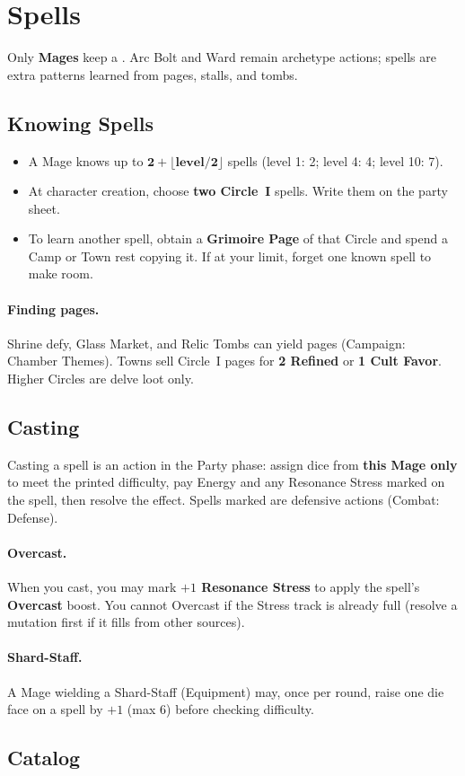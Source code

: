\section{Spells}

Only \textbf{Mages} keep a . Arc Bolt and Ward remain archetype actions; spells are extra patterns learned from pages, stalls, and tombs.

\subsection{Knowing Spells}

\begin{itemize}
    \item A Mage knows up to $\mathbf{2 + \lfloor \textrm{level}/2 \rfloor}$ spells (level 1: 2; level 4: 4; level 10: 7).
    \item At character creation, choose \textbf{two Circle~I} spells. Write them on the party sheet.
    \item To learn another spell, obtain a \textbf{Grimoire Page} of that Circle and spend a Camp or Town rest copying it. If at your limit, forget one known spell to make room.
\end{itemize}

\paragraph{Finding pages.}
Shrine defy, Glass Market, and Relic Tombs can yield pages (Campaign: Chamber Themes). Towns sell Circle~I pages for \textbf{2 Refined} or \textbf{1 Cult Favor}. Higher Circles are delve loot only.

\subsection{Casting}

Casting a spell is an action in the Party phase: assign dice from \textbf{this Mage only} to meet the printed difficulty, pay Energy and any Resonance Stress marked on the spell, then resolve the effect. Spells marked  are defensive actions (Combat: Defense).

\paragraph{Overcast.}
When you cast, you may mark \textbf{$+1$ Resonance Stress} to apply the spell's \textbf{Overcast} boost. You cannot Overcast if the Stress track is already full (resolve a mutation first if it fills from other sources).

\paragraph{Shard-Staff.}
A Mage wielding a Shard-Staff (Equipment) may, once per round, raise one die face on a spell by $+1$ (max 6) before checking difficulty.

\subsection{Catalog}



\clearpage
\twocolumn
